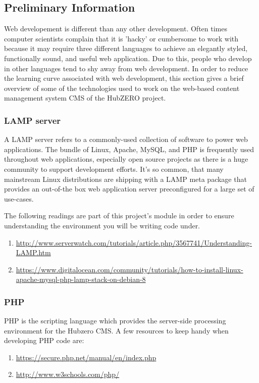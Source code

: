 \documentclass[10pt,letterpaper,titlepage]{article}
\begin{document}
\subsection{Preliminary Information}
Web developement is different than any other development. Often times computer scientists complain that it is 'hacky' or cumbersome to work with because it may require three different languages
to achieve an elegantly styled, functionally sound, and useful web application. Due to this, people who develop in other languages tend to shy away from web development. In order to reduce the learning curve
associated with web development, this section gives a brief overview of some of the technologies used to work on the web-based content management system {CMS} of the HubZERO project.

\subsubsection{LAMP server}
A LAMP server refers to a commonly-used collection of software to power web applications. The bundle of Linux, Apache, MySQL, and PHP is frequently used throughout web applications, especially open source projects
as there is a huge community to support development efforts. It's so common, that many mainstream Linux distributions are shipping with a LAMP meta package that provides an out-of-the box web application server
preconfigured for a large set of use-cases. 

The following readings are part of this project's module in order to ensure understanding the environment you will be writing code under.

\begin{enumerate}
\item \url{http://www.serverwatch.com/tutorials/article.php/3567741/Understanding-LAMP.htm}
\item \url{https://www.digitalocean.com/community/tutorials/how-to-install-linux-apache-mysql-php-lamp-stack-on-debian-8}
\end{enumerate}

\subsubsection{PHP}
PHP is the scripting language which provides the server-side processing environment for the Hubzero CMS. A few resources to keep handy when developing PHP code are:
\begin{enumerate}
\item \url{https://secure.php.net/manual/en/index.php}
\item \url{http://www.w3schools.com/php/}
\end{enumerate}
\end{document}
